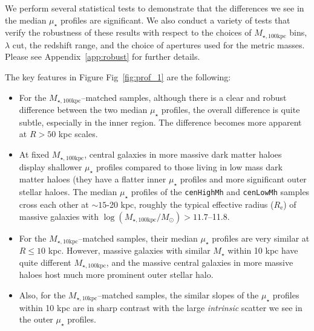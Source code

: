 \documentclass[a4paper,fleqn,usenatbib]{mnras}
\def\rbcg{\texttt{cenHighMh}}
\def\nbcg{\texttt{cenLowMh}}
\def\mstar{{$M_{\star}$}}
\def\minn{{$M_{\star,10\mathrm{kpc}}$}}
\def\mtot{{$M_{\star,100\mathrm{kpc}}$}}
\def\logmtot{{$\log (M_{\star,100\mathrm{kpc}}/M_{\odot})$}}
\def\mden{{$\mu_{\star}$}}
\begin{document}
    We perform several statistical tests to demonstrate that the differences we see in 
    the median \mden{} profiles are significant. 
    We also conduct a variety of tests that verify the robustness of these results with
    respect to the choices of \mtot{} bins, $\lambda$ cut, the redshift range, and the 
    choice of apertures used for the metric masses. 
    Please see Appendix~\ref{app:robust} for further details.
   
    The key features in Figure Fig~\ref{fig:prof_1} are the following:
    
    \begin{itemize}
        
        \item For the \mtot{}--matched samples, although there is a clear and robust 
            difference between the two median \mden{} profiles, the overall difference 
            is quite subtle, especially in the inner region. 
            The difference becomes more apparent at $R>50$ kpc scales.  
            
        \item At fixed \mtot{}, central galaxies in more massive dark matter haloes 
            display shallower \mden{} profiles compared to those living in low mass 
            dark matter haloes (they have a flatter inner \mden{} profiles and 
            more significant outer stellar haloes. 
            The median \mden{} profiles of the \rbcg{} and \nbcg{} samples cross 
            each other at ${\sim} 15$-20 kpc, roughly the typical effective radius 
            ($R_{\mathrm{e}}$) of massive galaxies with \logmtot{}$>11.7$--11.8.      
            
        \item For the \minn{}--matched samples, their median \mden{} profiles 
            are very similar at $R \leq 10$ kpc. 
            However, massive galaxies with similar \mstar{} within 10 kpc have quite
            different \mtot{}, and the massive central galaxies in 
            more massive haloes host much more prominent outer stellar halo. 
    
        \item Also, for the \minn{}--matched samples, the similar slopes of the 
            \mden{} profiles within 10 kpc are in sharp contrast with the large
            \textit{intrinsic} scatter we see in the outer \mden{} profiles. 
                        
    \end{itemize}
  
\end{document}

